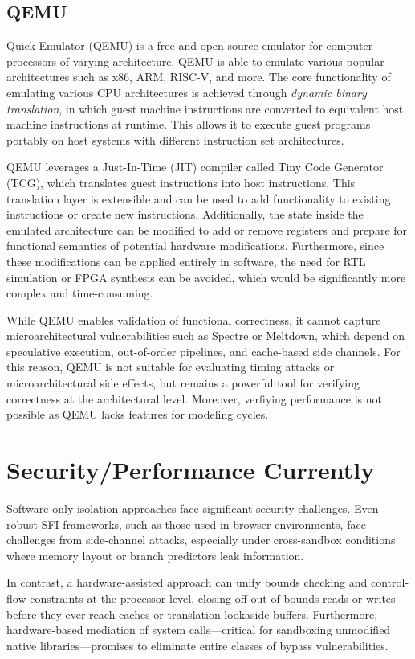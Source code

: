 \documentclass[conference,compsoc]{IEEEtran}
\begin{document}
\subsection{QEMU}

Quick Emulator (QEMU) is a free and open-source emulator for computer processors of varying architecture. 
QEMU is able to emulate various popular architectures such as x86, ARM, RISC-V, and more.
The core functionality of emulating various CPU architectures is achieved through \textit{dynamic binary translation}, in which guest machine instructions are converted to equivalent host machine instructions at runtime. 
This allows it to execute guest programs portably on host systems with different instruction set architectures.

QEMU leverages a Just-In-Time (JIT) compiler called Tiny Code Generator (TCG), which translates guest instructions into host instructions.
This translation layer is extensible and can be used to add functionality to existing instructions or create new instructions.
Additionally, the state inside the emulated architecture can be modified to add or remove registers and prepare for functional semantics of potential hardware modifications.
Furthermore, since these modifications can be applied entirely in software, the need for RTL simulation or FPGA synthesis can be avoided, which would be significantly more complex and time-consuming.

While QEMU enables validation of functional correctness, it cannot capture microarchitectural vulnerabilities such as Spectre or Meltdown, which depend on speculative execution, out-of-order pipelines, and cache-based side channels. 
For this reason, QEMU is not suitable for evaluating timing attacks or microarchitectural side effects, but remains a powerful tool for verifying correctness at the architectural level.
Moreover, verfiying performance is not possible as QEMU lacks features for modeling cycles.

\section{Security/Performance Currently}
Software-only isolation approaches face significant security challenges. Even robust SFI frameworks, such as those used in browser environments, face challenges from side-channel attacks, especially under cross-sandbox conditions where memory layout or branch predictors leak information.

In contrast, a hardware-assisted approach can unify bounds checking and control-flow constraints at the processor level, closing off out-of-bounds reads or writes before they ever reach caches or translation lookaside buffers. Furthermore, hardware-based mediation of system calls—critical for sandboxing unmodified native libraries—promises to eliminate entire classes of bypass vulnerabilities.
\end{document}
